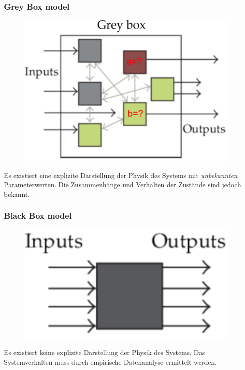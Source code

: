         \subsubsection{Grey Box model}
            \begin{figure}
                \vspace{-6mm}
                \includegraphics[width=\linewidth]{images/06/Greybox.jpg}
            \end{figure}
            Es existiert eine explizite Darstellung der Physik des Systems mit \textit{unbekannten} Parameterwerten. Die Zusammenhänge und Verhalten der Zustände sind jedoch bekannt.\\
            
            
           
        \subsubsection{Black Box model}
            \begin{figure}
                \vspace{-6mm}
                \includegraphics[width=\linewidth]{images/06/Blackbox.jpg}
            \end{figure}
            Es existiert keine explizite Darstellung der Physik des Systems. Das Systemverhalten muss durch empirische Datenanalyse ermittelt werden. 
           
